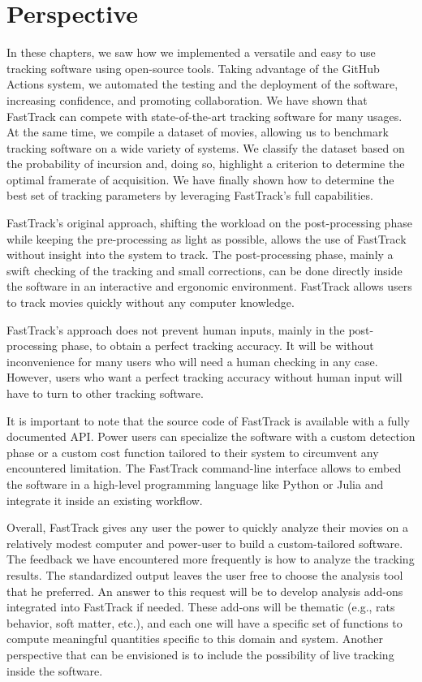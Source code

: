 \chapter{Perspective}
    In these chapters, we saw how we implemented a versatile and easy to use tracking software using open-source tools. Taking advantage of the GitHub Actions system, we automated the testing and the deployment of the software, increasing confidence, and promoting collaboration. We have shown that FastTrack can compete with state-of-the-art tracking software for many usages. At the same time, we compile a dataset of movies, allowing us to benchmark tracking software on a wide variety of systems. We classify the dataset based on the probability of incursion and, doing so, highlight a criterion to determine the optimal framerate of acquisition. We have finally shown how to determine the best set of tracking parameters by leveraging FastTrack's full capabilities.

    FastTrack's original approach, shifting the workload on the post-processing phase while keeping the pre-processing as light as possible, allows the use of FastTrack without insight into the system to track. The post-processing phase, mainly a swift checking of the tracking and small corrections, can be done directly inside the software in an interactive and ergonomic environment. FastTrack allows users to track movies quickly without any computer knowledge.

    FastTrack's approach does not prevent human inputs, mainly in the post-processing phase, to obtain a perfect tracking accuracy. It will be without inconvenience for many users who will need a human checking in any case. However, users who want a perfect tracking accuracy without human input will have to turn to other tracking software.

    It is important to note that the source code of FastTrack is available with a fully documented API. Power users can specialize the software with a custom detection phase or a custom cost function tailored to their system to circumvent any encountered limitation. The FastTrack command-line interface allows to embed the software in a high-level programming language like Python or Julia and integrate it inside an existing workflow.

    Overall, FastTrack gives any user the power to quickly analyze their movies on a relatively modest computer and power-user to build a custom-tailored software. The feedback we have encountered more frequently is how to analyze the tracking results. The standardized output leaves the user free to choose the analysis tool that he preferred. An answer to this request will be to develop analysis add-ons integrated into FastTrack if needed. These add-ons will be thematic (e.g., rats behavior, soft matter, etc.), and each one will have a specific set of functions to compute meaningful quantities specific to this domain and system. Another perspective that can be envisioned is to include the possibility of live tracking inside the software.


